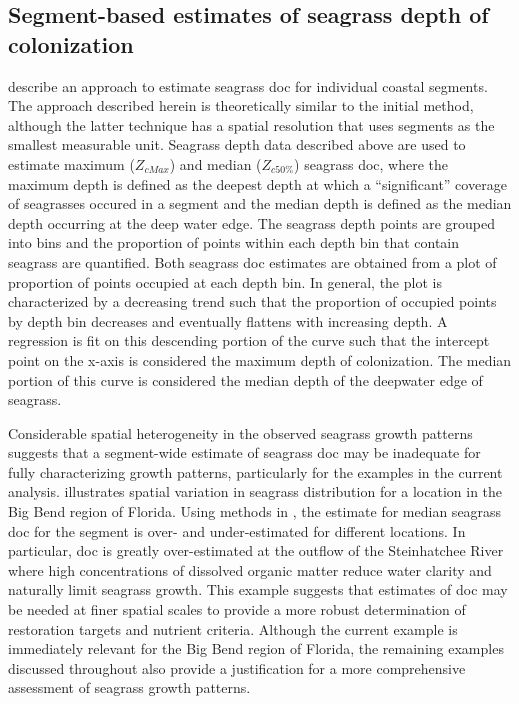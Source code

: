 \documentclass[letterpaper,12pt,oneside]{article}\usepackage[]{graphicx}\usepackage[]{color}
\begin{document}
\subsection{Segment-based estimates of seagrass depth of colonization}

 describe an approach to estimate seagrass \ac{doc} for individual coastal segments.  The approach described herein is theoretically similar to the initial method, although the latter technique has a spatial resolution that uses segments as the smallest measurable unit.  Seagrass depth data described above are used to estimate maximum ($Z_{cMax}$) and median ($Z_{c50\%}$) seagrass \ac{doc}, where the maximum depth is defined as the deepest depth at which a ``significant'' coverage of seagrasses occured in a segment and the median depth is defined as the median depth occurring at the deep water edge. The seagrass depth points are grouped into bins and the proportion of points within each depth bin that contain seagrass are quantified.  Both seagrass \ac{doc} estimates are obtained from a plot of proportion of points occupied at each depth bin.  In general, the plot is characterized by a decreasing trend such that the proportion of occupied points by depth bin decreases and eventually flattens with increasing depth.  A regression is fit on this descending portion of the curve such that the intercept point on the x-axis is considered the maximum depth of colonization.  The median portion of this curve is considered the median depth of the deepwater edge of seagrass.   

Considerable spatial heterogeneity in the observed seagrass growth patterns suggests that a segment-wide estimate of seagrass \ac{doc} may be inadequate for fully characterizing growth patterns, particularly for the examples in the current analysis.  illustrates spatial variation in seagrass distribution  for a location in the Big Bend region of Florida.  Using methods in , the estimate for median seagrass \ac{doc} for the segment is over- and under-estimated for different locations.  In particular, \ac{doc} is greatly over-estimated at the outflow of the Steinhatchee River where high concentrations of dissolved organic matter reduce water clarity and naturally limit seagrass growth.  This example suggests that estimates of \ac{doc} may be needed at finer spatial scales to provide a more robust determination of restoration targets and nutrient criteria.  Although the current example is immediately relevant for the Big Bend region of Florida, the remaining examples discussed throughout also provide a justification for a more comprehensive assessment of seagrass growth patterns.  
\end{document}
